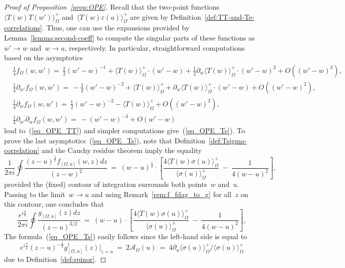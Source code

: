 \documentclass[reqno,11pt,a4paper]{amsart}
\theoremstyle{remark}
\newcommand{\OmegaU}{{[\Omega,u]}}
\newcommand{\f}{f_{\Omega}}
\newcommand{\fU}{f_\OmegaU}
\newcommand{\spinor}{g_\OmegaU}
\newcommand{\spinorReg}{\spinor^\dag}
\newcommand\Corr[1]{\langle #1 \rangle}
\newcommand\CorrO[2][+]{\Corr{#2}_\Omega^{#1}}
\begin{document}
\begin{proof}[Proof of Proposition~\ref{prop:OPE}] Recall that the two-point functions~$\CorrO{T(w)T(w')}$ and~$\CorrO{T(w)\varepsilon(a)}$ are given by Definition~\ref{def:TT-and-Te-correlations}. Thus, one can use the expansions provided by Lemma~\ref{lemma:second-coeff} to compute the singular parts of these functions as~$w'\to w$ and~$w\to a$, respectively. In particular, straightforward computations based on the asymptotics
\begin{align*}
&\tfrac{1}{4}\f(w,w')=\, \tfrac{1}{2}(w'\!-\!w)^{-1}\!+\CorrO{T(w)}\cdot(w'\!-\!w)+\tfrac{1}{2}\partial_{w}\CorrO{T(w)}\cdot(w'\!-\!w)^2+O((w'\!-\!w)^3), \\
&\tfrac{1}{4}\partial_{w'}\f(w,w') =\, -\tfrac{1}{2}(w'\!-\!w)^{-2}\!+\CorrO{T(w)}+\partial_{w}\CorrO{T(w)}\cdot(w'\!-\!w)+O((w'\!-\!w)^2), \\
&\tfrac{1}{4}\partial_{w}\f(w,w') =\,\tfrac{1}{2}(w'\!-\!w)^{-2}\! - \CorrO{T(w)} + O((w'\!-\!w)^2), \\
&\tfrac{1}{4}\partial_{w'}\partial_{w}\f(w,w') =\, -(w'\!-\!w)^{-3}\!+O(w'\!-\!w)
\end{align*}
lead to~(\ref{eq_OPE_TT}) and simpler computations give~(\ref{eq_OPE_Te}). To prove the last asymptotics~(\ref{eq_OPE_Ts}), note that Definition~\ref{def:Tsigma-correlation} and the Cauchy residue theorem imply the equality
\[
\frac{1}{2\pi i}\oint \frac{(z-u)^{\frac{1}{2}}\fU(w,z)dz}{(z-w)^2}\ = \ (w-u)^{\frac{1}{2}}\cdot\left[\frac{4\CorrO{T(w)\sigma(u)}}{\CorrO{\sigma(u)}}~-~\frac{1}{4(w-u)^2} \right],
\]
provided the (fixed) contour of integration surrounds both points~$w$ and~$u$. Passing to the limit~$w\to u$ and using Remark~\ref{rem:f_fdag_to_g} for all~$z$ on this contour, one concludes that
\[
\frac{e^{i\frac{\pi}{4}}}{2\pi i}\oint \frac{\spinor(z)dz}{(z-u)^{3/2}}\ =\ (w-u)\cdot\left[\frac{4\CorrO{T(w)\sigma(u)}}{\CorrO{\sigma(u)}}~-~\frac{1}{4(w-u)^2} \right],
\]
The formula~(\ref{eq_OPE_Ts}) easily follows since the left-hand side is equal to
\[
e^{i\frac{\pi}{4}}(z-u)^{-\frac{1}{2}}\spinorReg(z)\big|_{z=u}~=~2\mathcal{A}_\Omega(u)~=~4\partial_u\CorrO{\sigma(u)}\big/\CorrO{\sigma(u)}
\]
due to Definition~\ref{def:spinor}.
\end{proof}
\end{document}
